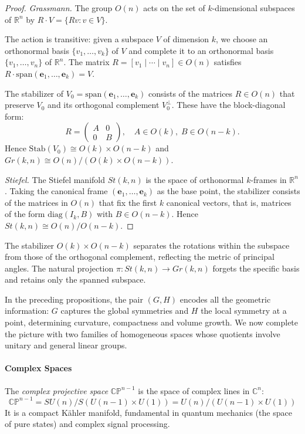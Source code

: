 \begin{proof}
\textit{Grassmann.} The group $O(n)$ acts on the set of $k$-dimensional subspaces of $\mathbb{R}^n$ by $R \cdot V = \{Rv : v \in V\}$.

The action is transitive: given a subspace $V$ of dimension $k$, we choose an orthonormal basis $\{v_1,\ldots,v_k\}$ of $V$ and complete it to an orthonormal basis $\{v_1,\ldots,v_n\}$ of $\mathbb{R}^n$. The matrix $R = [v_1 \mid \cdots \mid v_n] \in O(n)$ satisfies $R \cdot \mathrm{span}(\mathbf{e}_1,\ldots,\mathbf{e}_k) = V$.

The stabilizer of $V_0 = \mathrm{span}(\mathbf{e}_1,\ldots,\mathbf{e}_k)$ consists of the matrices $R \in O(n)$ that preserve $V_0$ and its orthogonal complement $V_0^\perp$. These have the block-diagonal form:
\[
R = \begin{pmatrix} A & 0 \\ 0 & B \end{pmatrix}, \quad A \in O(k), \; B \in O(n-k).
\]
Hence $\mathrm{Stab}(V_0) \cong O(k) \times O(n-k)$ and $Gr(k,n) \cong O(n)/(O(k) \times O(n-k))$.

\textit{Stiefel.} The Stiefel manifold $St(k,n)$ is the space of orthonormal $k$-frames in $\mathbb{R}^n$. Taking the canonical frame $(\mathbf{e}_1,\ldots,\mathbf{e}_k)$ as the base point, the stabilizer consists of the matrices in $O(n)$ that fix the first $k$ canonical vectors, that is, matrices of the form $\mathrm{diag}(I_k, B)$ with $B \in O(n-k)$. Hence $St(k,n) \cong O(n)/O(n-k)$.
\end{proof}

The stabilizer $O(k) \times O(n{-}k)$ separates the rotations within the subspace from those of the orthogonal complement, reflecting the metric of principal angles. The natural projection $\pi\colon St(k,n) \to Gr(k,n)$ forgets the specific basis and retains only the spanned subspace.

In the preceding propositions, the pair $(G, H)$ encodes all the geometric information: $G$ captures the global symmetries and $H$ the local symmetry at a point, determining curvature, compactness and volume growth. We now complete the picture with two families of homogeneous spaces whose quotients involve unitary and general linear groups.

\paragraph{Complex Spaces}

\begin{definition}\label{def:cp_homogeneo}
The \textit{complex projective space} $\mathbb{CP}^{n-1}$ is the space of complex lines in $\mathbb{C}^n$:
\begin{equation}
\mathbb{CP}^{n-1} = SU(n)/S(U(n-1) \times U(1)) = U(n)/(U(n-1) \times U(1))
\end{equation}
It is a compact Kähler manifold, fundamental in quantum mechanics (the space of pure states) and complex signal processing.
\end{definition}

